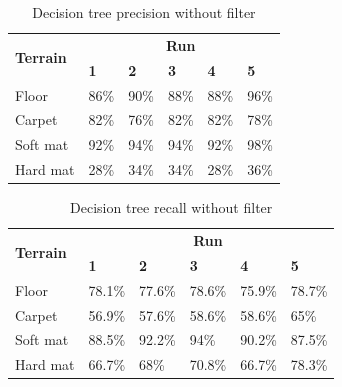 \documentclass[USenglish]{ifimaster}  %
\begin{document}
	\begin{table}[h]
		\centering
		\begin{tabular}{@{}llllll@{}}
			\toprule
			\multirow{2}{*}{\textbf{Terrain}} & \multicolumn{5}{c}{\textbf{Run}} \\ \cmidrule(l){2-6} 
			& \multicolumn{1}{l|}{\textbf{1}} & \multicolumn{1}{l|}{\textbf{2}} & \multicolumn{1}{l|}{\textbf{3}} & \multicolumn{1}{l|}{\textbf{4}} & \textbf{5} \\ \midrule
			\multicolumn{1}{l|}{Floor} & \multicolumn{1}{l|}{86\%} & \multicolumn{1}{l|}{90\%} & \multicolumn{1}{l|}{88\%} & \multicolumn{1}{l|}{88\%} & 96\% \\ \midrule
			\multicolumn{1}{l|}{Carpet} & \multicolumn{1}{l|}{82\%} & \multicolumn{1}{l|}{76\%} & \multicolumn{1}{l|}{82\%} & \multicolumn{1}{l|}{82\%} & 78\% \\ \midrule
			\multicolumn{1}{l|}{Soft mat} & \multicolumn{1}{l|}{92\%} & \multicolumn{1}{l|}{94\%} & \multicolumn{1}{l|}{94\%} & \multicolumn{1}{l|}{92\%} & 98\% \\ \midrule
			\multicolumn{1}{l|}{Hard mat} & \multicolumn{1}{l|}{28\%} & \multicolumn{1}{l|}{34\%} & \multicolumn{1}{l|}{34\%} & \multicolumn{1}{l|}{28\%} & 36\% \\ \bottomrule
		\end{tabular}
		\caption{Decision tree precision without filter}
		\label{dt1Precision}
	\end{table}
	\FloatBarrier
	\begin{table}[h]
		\centering
		\begin{tabular}{@{}llllll@{}}
			\toprule
			\multirow{2}{*}{\textbf{Terrain}} & \multicolumn{5}{c}{\textbf{Run}} \\ \cmidrule(l){2-6} 
			& \multicolumn{1}{l|}{\textbf{1}} & \multicolumn{1}{l|}{\textbf{2}} & \multicolumn{1}{l|}{\textbf{3}} & \multicolumn{1}{l|}{\textbf{4}} & \textbf{5} \\ \midrule
			\multicolumn{1}{l|}{Floor} & \multicolumn{1}{l|}{78.1\%} & \multicolumn{1}{l|}{77.6\%} & \multicolumn{1}{l|}{78.6\%} & \multicolumn{1}{l|}{75.9\%} & 78.7\% \\ \midrule
			\multicolumn{1}{l|}{Carpet} & \multicolumn{1}{l|}{56.9\%} & \multicolumn{1}{l|}{57.6\%} & \multicolumn{1}{l|}{58.6\%} & \multicolumn{1}{l|}{58.6\%} & 65\% \\ \midrule
			\multicolumn{1}{l|}{Soft mat} & \multicolumn{1}{l|}{88.5\%} & \multicolumn{1}{l|}{92.2\%} & \multicolumn{1}{l|}{94\%} & \multicolumn{1}{l|}{90.2\%} & 87.5\% \\ \midrule
			\multicolumn{1}{l|}{Hard mat} & \multicolumn{1}{l|}{66.7\%} & \multicolumn{1}{l|}{68\%} & \multicolumn{1}{l|}{70.8\%} & \multicolumn{1}{l|}{66.7\%} & 78.3\% \\ \bottomrule
		\end{tabular}
		\caption{Decision tree recall without filter}
		\label{dt1recall}
	\end{table}
	\FloatBarrier
	
\end{document}
